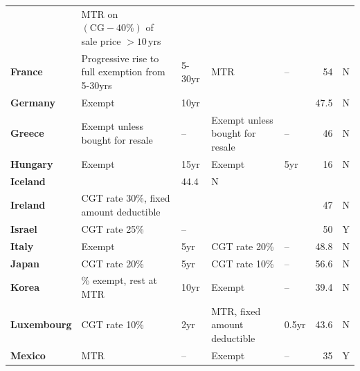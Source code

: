 \begin{subappendices}
\begin{longtable}{l>{\raggedleft}p{8.05cm}>{\raggedleft}p{1.45cm}>{\raggedleft}p{6.75cm}>{\raggedleft}p{1.45cm}r>{\raggedleft\arraybackslash}p{1.55cm}}
          & \cellcolor{Color3}MTR on $(\text{CG}-40\%)$ of sale price $>10$\,yrs  &   \cellcolor{Color3}     &  \cellcolor{Color3}      &  \cellcolor{Color3}      &   \cellcolor{Color3}     &  \cellcolor{Color3}  \\[4pt]
    \textbf{France} &  \cellcolor{Color3} Progressive rise to full exemption from 5-30yrs &  \cellcolor{Color3} 5-30yr & \cellcolor{Color6} MTR   &  \cellcolor{Color6}--     &  \cellcolor{Color6}54    & \cellcolor{Color3} N \\
    \textbf{Germany} &  \cellcolor{Color3}Exempt &  \cellcolor{Color3}10yr  &  \cellcolor{Color4}{26\% exempt, rest at MTR} &  \cellcolor{Color4}{--}     &  \cellcolor{Color3}47.5  & \cellcolor{Color3} N \\
    \textbf{Greece} &  \cellcolor{Color2}Exempt unless bought for resale &  \cellcolor{Color2}--     &  \cellcolor{Color2}Exempt unless bought for resale & \cellcolor{Color2} --     &  \cellcolor{Color3}46    & \cellcolor{Color3} N \\
    \textbf{Hungary} &  \cellcolor{Color3}Exempt &  \cellcolor{Color3}15yr  &  \cellcolor{Color3}Exempt &  \cellcolor{Color3}5yr   &  \cellcolor{Color1}16    &  \cellcolor{Color3}N \\
    \textbf{Iceland} & \multicolumn{4}{c}{\cellcolor{Color6}{\textcolor{white}{MTR}}} &  \cellcolor{Color2}44.4  &  \cellcolor{Color3}N \\
    \textbf{Ireland} & \cellcolor{Color3}CGT rate 30\%, fixed amount deductible & \cellcolor{Color3}{--}     & \cellcolor{Color6}{\textcolor{white}{MTR}}   & \cellcolor{Color6}{\textcolor{white}{--}}     & \cellcolor{Color3}47    & \cellcolor{Color3}N \\
    \textbf{Israel} &\cellcolor{Color3} CGT rate 25\% & \cellcolor{Color3} --     & \cellcolor{Color6}{\textcolor{white}{MTR}}   & \cellcolor{Color6}{\textcolor{white}{--}}   & \cellcolor{Color3}50    & \cellcolor{Color3}Y \\
    \textbf{Italy} & Exempt & 5yr   & CGT rate 20\% & --     & 48.8  & N \\
    \textbf{Japan} & CGT rate 20\% & 5yr   & CGT rate 10\% & --     & 56.6  & N \\
    \textbf{Korea} & 30\% exempt, rest at MTR & 10yr  & Exempt & --     & 39.4  & N \\
    \textbf{Luxembourg} & CGT rate 10\% & 2yr   & MTR, fixed amount deductible & 0.5yr & 43.6  & N \\
    \textbf{Mexico} & MTR   & --     & Exempt & --     & 35    & Y \\

\end{longtable}
\end{subappendices}

